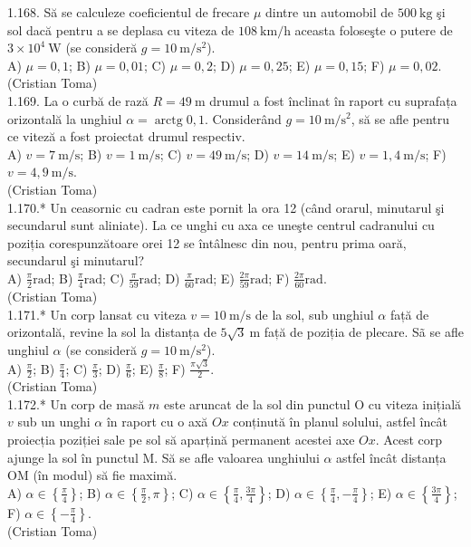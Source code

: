 1.168. Să se calculeze coeficientul de frecare $\mu$ dintre un automobil de $500 \mathrm{~kg}$ şi sol dacă pentru a se deplasa cu viteza de $108 \mathrm{~km} / \mathrm{h}$ aceasta foloseşte o putere de $3 \times 10^{4} \mathrm{~W}$ (se consideră $g=10 \mathrm{~m} / \mathrm{s}^{2}$).\\ A) $\mu=0,1$; B) $\mu=0,01$; C) $\mu=0,2$; D) $\mu=0,25$; E) $\mu=0,15$; F) $\mu=0,02$.\\ (Cristian Toma)\\

1.169. La o curbă de rază $R=49 \mathrm{~m}$ drumul a fost înclinat în raport cu suprafața orizontală la unghiul $\alpha=\operatorname{arctg} 0,1$. Considerând $g=10 \mathrm{~m} / \mathrm{s}^{2}$, să se afle pentru ce viteză a fost proiectat drumul respectiv.\\ A) $v=7 \mathrm{~m} / \mathrm{s}$; B) $v=1 \mathrm{~m} / \mathrm{s}$; C) $v=49 \mathrm{~m} / \mathrm{s}$; D) $v=14 \mathrm{~m} / \mathrm{s}$; E) $v=1,4 \mathrm{~m} / \mathrm{s}$; F) $v=4,9 \mathrm{~m} / \mathrm{s}$.\\ (Cristian Toma)\\

1.170.* Un ceasornic cu cadran este pornit la ora 12 (când orarul, minutarul şi secundarul sunt aliniate). La ce unghi cu axa ce uneşte centrul cadranului cu poziția corespunzătoare orei 12 se întâlnesc din nou, pentru prima oară, secundarul şi minutarul?\\ A) $\frac{\pi}{2} \mathrm{rad}$; B) $\frac{\pi}{4} \mathrm{rad}$; C) $\frac{\pi}{59} \mathrm{rad}$; D) $\frac{\pi}{60} \mathrm{rad}$; E) $\frac{2 \pi}{59} \mathrm{rad}$; F) $\frac{2 \pi}{60} \mathrm{rad}$.\\ (Cristian Toma)\\

1.171.* Un corp lansat cu viteza $v=10 \mathrm{~m} / \mathrm{s}$ de la sol, sub unghiul $\alpha$ față de orizontală, revine la sol la distanța de $5 \sqrt{3} \mathrm{~m}$ față de poziția de plecare. Sã se afle unghiul $\alpha$ (se consideră $g=10 \mathrm{~m} / \mathrm{s}^{2}$).\\ A) $\frac{\pi}{2}$; B) $\frac{\pi}{4}$; C) $\frac{\pi}{3}$; D) $\frac{\pi}{6}$; E) $\frac{\pi}{8}$; F) $\frac{\pi \sqrt{3}}{2}$.\\ (Cristian Toma)\\

1.172.* Un corp de masă $m$ este aruncat de la sol din punctul O cu viteza inițială $v$ sub un unghi $\alpha$ în raport cu o axă $Ox$ conținută în planul solului, astfel încât proiecția poziției sale pe sol să aparțină permanent acestei axe $Ox$. Acest corp ajunge la sol în punctul M. Să se afle valoarea unghiului $\alpha$ astfel încât distanța OM (în modul) să fie maximă.\\ A) $\alpha \in\left\{\frac{\pi}{4}\right\}$; B) $\alpha \in\left\{\frac{\pi}{2}, \pi\right\}$; C) $\alpha \in\left\{\frac{\pi}{4}, \frac{3 \pi}{4}\right\}$; D) $\alpha \in\left\{\frac{\pi}{4},-\frac{\pi}{4}\right\}$; E) $\alpha \in\left\{\frac{3 \pi}{4}\right\}$; F) $\alpha \in\left\{-\frac{\pi}{4}\right\}$.\\ (Cristian Toma)\\

